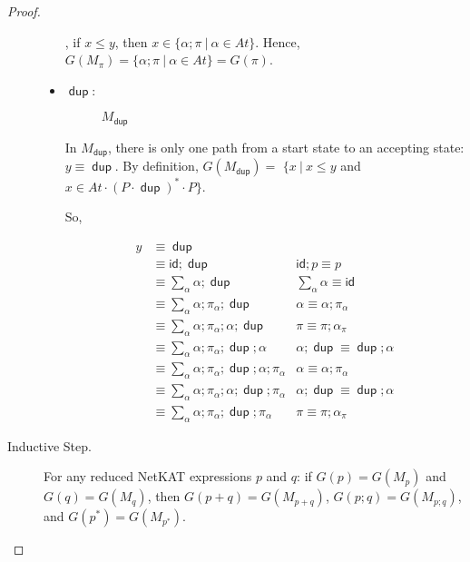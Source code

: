 \documentclass{article}
\newcommand\At{\ensuremath{\mathit{At}}}
\newcommand\pdup{\mathop{\mathsf{dup}}}
\renewcommand\star{^{\textstyle *}}
\newcommand\id{\mathsf{id}}
\newcommand\JI{\At\cdot(P\cdot\pdup)\star\cdot P}
\begin{document}
\begin{proof}
\begin{description}
\begin{itemize}
  , if $x \leq y$, then $x \in \{\alpha;\pi\ |\ \alpha \in At\}$. Hence, 
  $G(M_\pi) = \{\alpha;\pi\ |\ \alpha \in At\} = G(\pi)$.
  
  \item $\pdup$:
  \begin{figure}[H]
    \centering
    \caption{$M_{\pdup}$}
  \end{figure}
  
  In $M_{\pdup}$, there is only one path from a start state to an accepting 
  state: $y\equiv \pdup$. By definition, $G(M_{\pdup}) = $
  $\{x\ |\ x\leq y$ and $x \in \JI \}$.
  
  So, 
  
  \begin{align*}
  y &\equiv \pdup \\
    &\equiv \id;\pdup & \id;p \equiv p \\
    &\equiv \displaystyle \sum_\alpha \alpha;\pdup & \displaystyle \sum_\alpha 
      \alpha \equiv \id \\
    &\equiv \displaystyle \sum_\alpha \alpha;\pi_\alpha;\pdup & \alpha \equiv
      \alpha;\pi_\alpha \\
    &\equiv \displaystyle \sum_\alpha \alpha;\pi_\alpha;\alpha;\pdup & \pi 
      \equiv \pi;\alpha_\pi \\
    &\equiv \displaystyle \sum_\alpha \alpha;\pi_\alpha;\pdup;\alpha & 
      \alpha;\pdup \equiv \pdup;\alpha \\
    &\equiv \displaystyle \sum_\alpha \alpha;\pi_\alpha;\pdup;\alpha;\pi_\alpha
      & \alpha \equiv \alpha;\pi_\alpha \\
    &\equiv \displaystyle \sum_\alpha \alpha;\pi_\alpha;\alpha;\pdup;\pi_\alpha
      & \alpha;\pdup \equiv \pdup;\alpha \\
    &\equiv \displaystyle \sum_\alpha \alpha;\pi_\alpha;\pdup;\pi_\alpha & 
      \pi \equiv \pi;\alpha_\pi
  \end{align*}
\end{itemize}
  
\item[Inductive Step.] For any reduced NetKAT expressions $p$ and $q$: if 
$G(p) = G(M_{p})$ and $G(q) = G(M_{q})$, then $G(p+q) = G(M_{p+q})$, 
$G(p;q) = G(M_{p;q})$, and $G(p\star) = G(M_{p\star})$.


\end{description}
\end{proof}
\end{document}

